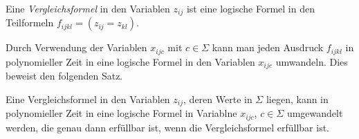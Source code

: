 \begin{definition}
Eine {\em Vergleichsformel} in den Variablen $z_{ij}$ ist eine
logische Formel in den Teilformeln $f_{ijkl}=(z_{ij}=z_{kl})$.
\end{definition}

Durch Verwendung der Variablen $x_{ijc}$ mit $c\in\Sigma$ kann man
jeden Ausdruck $f_{ijkl}$ in polynomieller Zeit in eine logische
Formel in den Variablen $x_{ijc}$ umwandeln.
Dies beweist den folgenden Satz.

\begin{satz}
\label{skript:satz:vergleichsformel}
Eine Vergleichsformel in den Variablen $z_{ij}$, deren Werte in $\Sigma$
liegen, kann in polynomieller Zeit in eine logische Formel in Variablne
$x_{ijc}$, $c\in\Sigma$ umgewandelt werden, die genau dann erfüllbar ist,
wenn die Vergleichsformel erfüllbar ist.
\end{satz}





